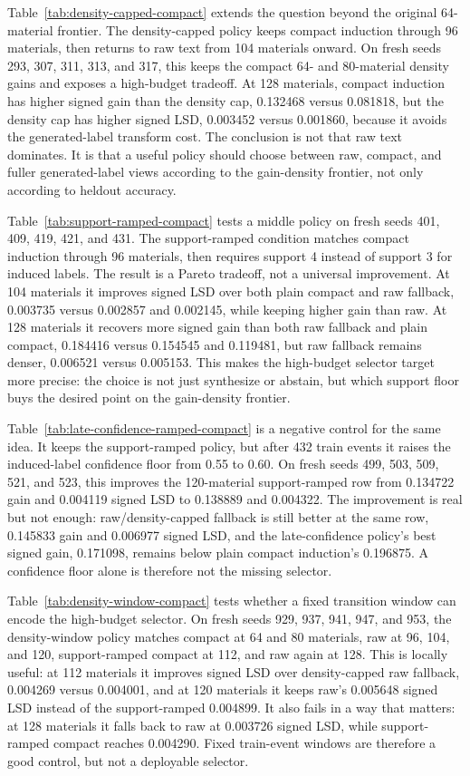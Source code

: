 \documentclass[11pt]{article}
\begin{document}
Table~\ref{tab:density-capped-compact} extends the question beyond the original
64-material frontier. The density-capped policy keeps compact induction through
96 materials, then returns to raw text from 104 materials onward. On fresh
seeds 293, 307, 311, 313, and 317, this keeps the compact 64- and 80-material
density gains and exposes a high-budget tradeoff. At 128 materials, compact
induction has higher signed gain than the density cap, 0.132468 versus
0.081818, but the density cap has higher signed LSD, 0.003452 versus 0.001860,
because it avoids the generated-label transform cost. The conclusion is not
that raw text dominates. It is that a useful policy should choose between raw,
compact, and fuller generated-label views according to the gain-density
frontier, not only according to heldout accuracy.

Table~\ref{tab:support-ramped-compact} tests a middle policy on fresh seeds
401, 409, 419, 421, and 431. The support-ramped condition matches compact
induction through 96 materials, then requires support 4 instead of support 3
for induced labels. The result is a Pareto tradeoff, not a universal
improvement. At 104 materials it improves signed LSD over both plain compact
and raw fallback, 0.003735 versus 0.002857 and 0.002145, while keeping higher
gain than raw. At 128 materials it recovers more signed gain than both raw
fallback and plain compact, 0.184416 versus 0.154545 and 0.119481, but raw
fallback remains denser, 0.006521 versus 0.005153. This makes the high-budget
selector target more precise: the choice is not just synthesize or abstain, but
which support floor buys the desired point on the gain-density frontier.

Table~\ref{tab:late-confidence-ramped-compact} is a negative control for the
same idea. It keeps the support-ramped policy, but after 432 train events it
raises the induced-label confidence floor from 0.55 to 0.60. On fresh seeds
499, 503, 509, 521, and 523, this improves the 120-material support-ramped row
from 0.134722 gain and 0.004119 signed LSD to 0.138889 and 0.004322. The
improvement is real but not enough: raw/density-capped fallback is still better
at the same row, 0.145833 gain and 0.006977 signed LSD, and the
late-confidence policy's best signed gain, 0.171098, remains below plain
compact induction's 0.196875. A confidence floor alone is therefore not the
missing selector.

Table~\ref{tab:density-window-compact} tests whether a fixed transition window
can encode the high-budget selector. On fresh seeds 929, 937, 941, 947, and
953, the density-window policy matches compact at 64 and 80 materials, raw at
96, 104, and 120, support-ramped compact at 112, and raw again at 128. This is
locally useful: at 112 materials it improves signed LSD over density-capped
raw fallback, 0.004269 versus 0.004001, and at 120 materials it keeps raw's
0.005648 signed LSD instead of the support-ramped 0.004899. It also fails in a
way that matters: at 128 materials it falls back to raw at 0.003726 signed
LSD, while support-ramped compact reaches 0.004290. Fixed train-event windows
are therefore a good control, but not a deployable selector.
\end{document}
